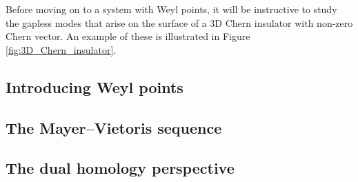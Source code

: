 Before moving on to a system with Weyl points, it will be instructive to study the gapless modes that arise on the surface of a 3D Chern insulator with non-zero Chern vector. An example of these is illustrated in Figure \ref{fig:3D_Chern_insulator}.


\subsection{Introducing Weyl points}


\subsection{The Mayer--Vietoris sequence}


\subsection{The dual homology perspective}